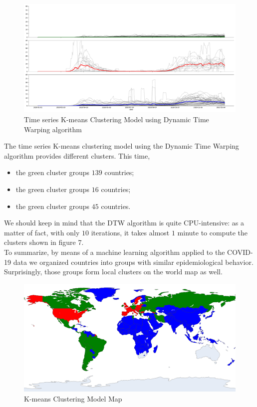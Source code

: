 \documentclass[11pt,a4paper]{article}
\begin{document}
\begin{figure}[H]
    \begin{center}
        \includegraphics[scale=0.32]{img/daily-deaths-dtw-clusters.pdf}
    \end{center}
    \caption{Time series K-means Clustering Model using Dynamic Time Warping algorithm}
\end{figure}
\noindent The time series K-means clustering model using the Dynamic Time
Warping algorithm provides different clusters. This time,
\begin{itemize}
    \item the {\color{ForestGreen}green cluster} groups $139$ countries;
    \item the {\color{red}green cluster} groups $16$ countries;
    \item the {\color{blue}green cluster} groups $45$ countries.
\end{itemize}
We should keep in mind that the DTW algorithm is quite CPU-intensive: as a
matter of fact, with only $10$ iterations, it takes almost $1$ minute to
compute the clusters shown in figure 7.\\
To summarize, by means of a machine learning algorithm applied to the COVID-19
data we organized countries into groups with similar epidemiological behavior.
Surprisingly, those groups form local clusters on the world map as well.
\begin{figure}[H]
    \begin{center}
        \includegraphics[scale=0.9]{img/clusters-map.png}
    \end{center}
    \caption{K-means Clustering Model Map}
\end{figure}
\end{document}
